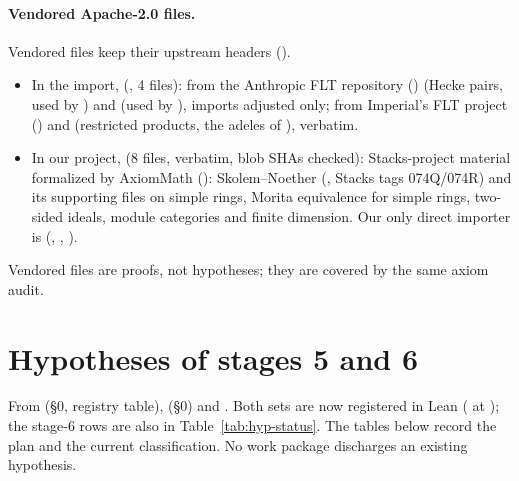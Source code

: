 \paragraph{Vendored Apache-2.0 files.} Vendored files keep their upstream headers ().
\begin{itemize}[leftmargin=1.2em]
\item In the import,  (, 4 files): from the Anthropic FLT repository
  \cite{FLTAnthropic} ()  (Hecke pairs, used by
  ) and  (used by
  ), imports adjusted only; from Imperial's FLT project \cite{FLTImperial}
  ()  and
   (restricted products, the adeles of
  ), verbatim.
\item In our project,  (8 files, verbatim, blob SHAs checked):
  Stacks-project material formalized by AxiomMath \cite{AxiomStacks} (): Skolem--Noether
  (, Stacks tags 074Q/074R) and its supporting files on simple rings, Morita
  equivalence for simple rings, two-sided ideals, module categories and finite dimension. Our only direct importer is
   (, ,
  ).
\end{itemize}
Vendored files are proofs, not hypotheses; they are covered by the same axiom audit.

\section{Hypotheses of stages 5 and 6}\label{sec:hyp-planned}

From  (\S0, registry table),  (\S0) and
. Both sets are now registered in Lean ( at ); the stage-6 rows are also in
Table~\ref{tab:hyp-status}. The tables below record the plan and the current classification. No work package discharges an existing
hypothesis.

